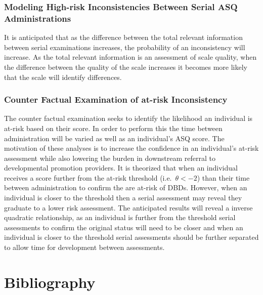 \documentclass[
  11pt,
]{article}
\begin{document}
\hypertarget{modeling-high-risk-inconsistencies-between-serial-asq-administrations-1}{%
\subsubsection{Modeling High-risk Inconsistencies Between Serial ASQ
Administrations}\label{modeling-high-risk-inconsistencies-between-serial-asq-administrations-1}}

It is anticipated that as the difference between the total relevant
information between serial examinations increases, the probability of an
inconsistency will increase. As the total relevant information is an
assessment of scale quality, when the difference between the quality of
the scale increases it becomes more likely that the scale will identify
differences.

\hypertarget{counter-factual-examination-of-at-risk-inconsistency-1}{%
\subsubsection{Counter Factual Examination of at-risk
Inconsistency}\label{counter-factual-examination-of-at-risk-inconsistency-1}}

The counter factual examination seeks to identify the likelihood an
individual is at-risk based on their score. In order to perform this the
time between administration will be varied as well as an individual's
ASQ score. The motivation of these analyses is to increase the
confidence in an individual's at-risk assessment while also lowering the
burden in downstream referral to developmental promotion providers. It
is theorized that when an individual receives a score further from the
at-risk threshold (i.e.~\(\theta < -2\)) than their time between
administration to confirm the are at-risk of DBDs. However, when an
individual is closer to the threshold then a serial assessment may
reveal they graduate to a lower risk assessment. The anticipated results
will reveal a inverse quadratic relationship, as an individual is
further from the threshold serial assessments to confirm the original
status will need to be closer and when an individual is closer to the
threshold serial assessments should be further separated to allow time
for development between assessments.

\hypertarget{bibliography}{%
\section*{Bibliography}\label{bibliography}}
\end{document}
